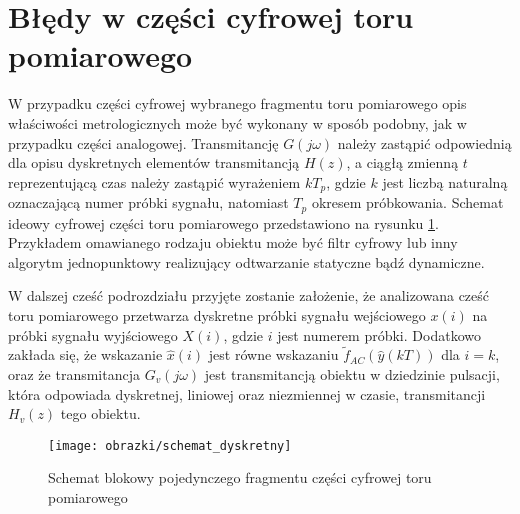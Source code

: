 \section{Błędy w części cyfrowej toru pomiarowego}

W przypadku części cyfrowej wybranego fragmentu toru pomiarowego opis właściwości metrologicznych może być wykonany w sposób podobny, jak w przypadku części analogowej. Transmitancję $G(j\omega)$ należy zastąpić odpowiednią dla opisu dyskretnych elementów transmitancją $H(z)$, a ciągłą zmienną $t$ reprezentującą czas należy zastąpić wyrażeniem $kT_{p}$, gdzie $k$ jest liczbą naturalną oznaczającą numer próbki sygnału, natomiast $T_{p}$ okresem próbkowania. Schemat ideowy cyfrowej części toru pomiarowego przedstawiono na rysunku \ref{fig_chain_disc}. Przykładem omawianego rodzaju obiektu może być filtr cyfrowy lub inny algorytm jednopunktowy realizujący odtwarzanie statyczne bądź dynamiczne.

W dalszej cześć podrozdziału przyjęte zostanie założenie, że analizowana cześć toru pomiarowego przetwarza dyskretne próbki sygnału wejściowego $x(i)$ na próbki sygnału wyjściowego $X(i)$, gdzie $i$ jest numerem próbki. Dodatkowo zakłada się, że wskazanie $\hat{x}(i)$ jest równe wskazaniu $\tilde{f}_{AC} \left( \hat{y}(kT) \right)$ dla $i = k$, oraz że transmitancja $G_{v}(j\omega)$ jest transmitancją obiektu w dziedzinie pulsacji, która odpowiada dyskretnej, liniowej oraz niezmiennej w czasie, transmitancji $H_{v}(z)$ tego obiektu.

\begin{figure}[htb!]
\begin{center}
\texttt{[image: obrazki/schemat\_dyskretny]}
\caption{Schemat blokowy pojedynczego fragmentu części cyfrowej toru pomiarowego \label{fig_chain_disc}}
\end{center}
\end{figure}

